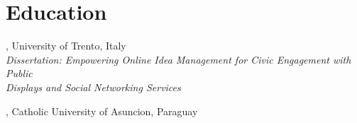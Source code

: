 
\section{Education}
, University of Trento, Italy \\
{\sl Dissertation: Empowering Online Idea Management for Civic Engagement with Public\\Displays and Social Networking Services}

, Catholic University of Asuncion, Paraguay 
